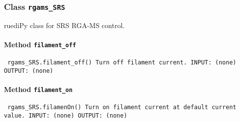 
\subsubsection{Class \texttt{rgams_SRS}}
\par
ruediPy class for SRS RGA-MS control.\par

\paragraph{Method \texttt{filament_off}}
\vspace{1ex}
\texttt{\newline
rgams_SRS.filament_off()\newline
\newline
Turn off filament current.\newline
\newline
INPUT:\newline
(none)\newline
\newline
OUTPUT:\newline
(none)\newline
\newline
}

\paragraph{Method \texttt{filament_on}}
\vspace{1ex}
\texttt{\newline
rgams_SRS.filamenOn()\newline
\newline
Turn on filament current at default current value.\newline
\newline
INPUT:\newline
(none)\newline
\newline
OUTPUT:\newline
(none)\newline
\newline
}

